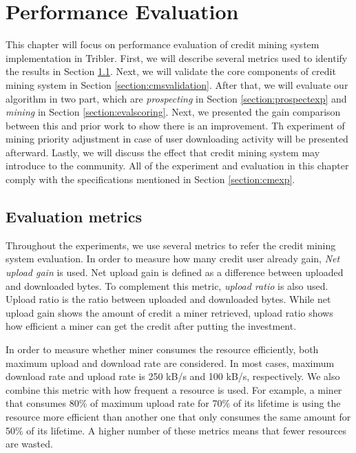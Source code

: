 \chapter{Performance Evaluation}
\label{chp:perfeval}

This chapter will focus on performance evaluation of credit mining system implementation in Tribler. First, we will describe several metrics used to identify the results in Section \ref{section:evalmetrics}. Next, we will validate the core components of credit mining system in Section \ref{section:cmsvalidation}. After that, we will evaluate our algorithm in two part, which are \textit{prospecting} in Section \ref{section:prospectexp} and \textit{mining} in Section \ref{section:evalscoring}. Next, we presented the gain comparison between this and prior work to show there is an improvement. Th experiment of mining priority adjustment in case of user downloading activity will be presented afterward. Lastly, we will discuss the effect that credit mining system may introduce to the community. All of the experiment and evaluation in this chapter comply with the specifications mentioned in Section \ref{section:cmexp}. 

\section{Evaluation metrics}
\label{section:evalmetrics}
Throughout the experiments, we use several metrics to refer the credit mining system evaluation. In order to measure how many credit user already gain, \textit{Net upload gain}\cite{2015:creditmining:capota} is used. Net upload gain is defined as a difference between uploaded and downloaded bytes. To complement this metric, \textit{upload ratio} is also used. Upload ratio is the ratio between uploaded and downloaded bytes. While net upload gain shows the amount of credit a miner retrieved, upload ratio shows how efficient a miner can get the credit after putting the investment.

In order to measure whether miner consumes the resource efficiently, both maximum upload and download rate are considered. In most cases, maximum download rate and upload rate is 250 kB/s and 100 kB/s, respectively. We also combine this metric with how frequent a resource is used. For example, a miner that consumes 80\% of maximum upload rate for 70\% of its lifetime is using the resource more efficient than another one that only consumes the same amount for 50\% of its lifetime. A higher number of these metrics means that fewer resources are wasted. 

